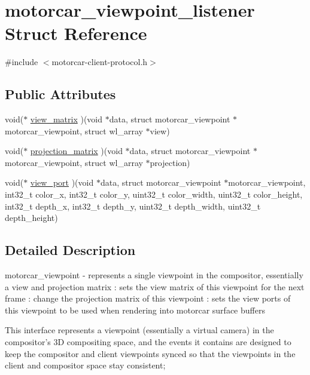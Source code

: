 \hypertarget{structmotorcar__viewpoint__listener}{\section{motorcar\-\_\-viewpoint\-\_\-listener Struct Reference}
\label{structmotorcar__viewpoint__listener}
}


{\ttfamily \#include $<$motorcar-\/client-\/protocol.\-h$>$}

\subsection*{Public Attributes}
\begin{DoxyCompactItemize}
\item 
void($\ast$ \hyperlink{structmotorcar__viewpoint__listener_a62bcafc2fde2470d81ea8bce70855af5}{view\-\_\-matrix} )(void $\ast$data, struct motorcar\-\_\-viewpoint $\ast$motorcar\-\_\-viewpoint, struct wl\-\_\-array $\ast$view)
\item 
void($\ast$ \hyperlink{structmotorcar__viewpoint__listener_ac3811e768cf181e5c3c4377fd11816d8}{projection\-\_\-matrix} )(void $\ast$data, struct motorcar\-\_\-viewpoint $\ast$motorcar\-\_\-viewpoint, struct wl\-\_\-array $\ast$projection)
\item 
void($\ast$ \hyperlink{structmotorcar__viewpoint__listener_a0b3a306b14550df2000169a8984d925f}{view\-\_\-port} )(void $\ast$data, struct motorcar\-\_\-viewpoint $\ast$motorcar\-\_\-viewpoint, int32\-\_\-t color\-\_\-x, int32\-\_\-t color\-\_\-y, uint32\-\_\-t color\-\_\-width, uint32\-\_\-t color\-\_\-height, int32\-\_\-t depth\-\_\-x, int32\-\_\-t depth\-\_\-y, uint32\-\_\-t depth\-\_\-width, uint32\-\_\-t depth\-\_\-height)
\end{DoxyCompactItemize}


\subsection{Detailed Description}
motorcar\-\_\-viewpoint -\/ represents a single viewpoint in the compositor, essentially a view and projection matrix \-: sets the view matrix of this viewpoint for the next frame \-: change the projection matrix of this viewpoint \-: sets the view ports of this viewpoint to be used when rendering into motorcar surface buffers

This interface represents a viewpoint (essentially a virtual camera) in the compositor's 3\-D compositing space, and the events it contains are designed to keep the compositor and client viewpoints synced so that the viewpoints in the client and compositor space stay consistent; 

